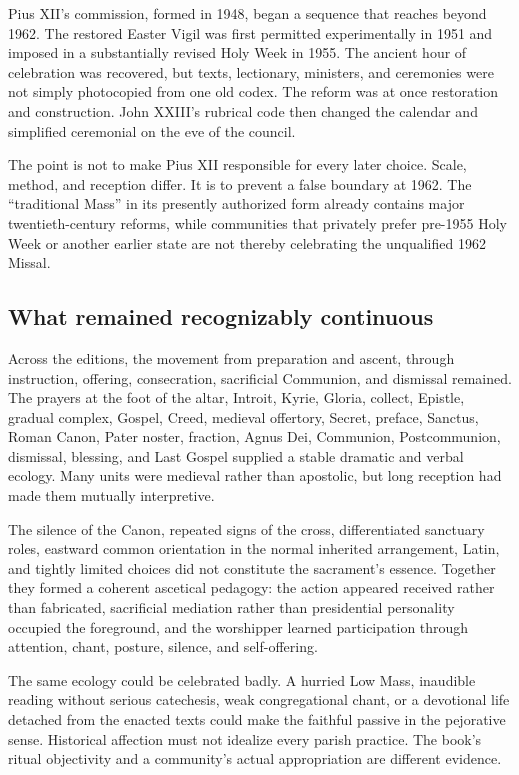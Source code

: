 Pius XII's commission, formed in 1948, began a sequence that reaches beyond 1962. The restored Easter Vigil was first permitted experimentally in 1951 and imposed in a substantially revised Holy Week in 1955. The ancient hour of celebration was recovered, but texts, lectionary, ministers, and ceremonies were not simply photocopied from one old codex. The reform was at once restoration and construction. John XXIII's rubrical code then changed the calendar and simplified ceremonial on the eve of the council.

The point is not to make Pius XII responsible for every later choice. Scale, method, and reception differ. It is to prevent a false boundary at 1962. The “traditional Mass” in its presently authorized form already contains major twentieth-century reforms, while communities that privately prefer pre-1955 Holy Week or another earlier state are not thereby celebrating the unqualified 1962 Missal.

\subsection{What remained recognizably continuous}

Across the editions, the movement from preparation and ascent, through instruction, offering, consecration, sacrificial Communion, and dismissal remained. The prayers at the foot of the altar, Introit, Kyrie, Gloria, collect, Epistle, gradual complex, Gospel, Creed, medieval offertory, Secret, preface, Sanctus, Roman Canon, Pater noster, fraction, Agnus Dei, Communion, Postcommunion, dismissal, blessing, and Last Gospel supplied a stable dramatic and verbal ecology. Many units were medieval rather than apostolic, but long reception had made them mutually interpretive.

The silence of the Canon, repeated signs of the cross, differentiated sanctuary roles, eastward common orientation in the normal inherited arrangement, Latin, and tightly limited choices did not constitute the sacrament's essence. Together they formed a coherent ascetical pedagogy: the action appeared received rather than fabricated, sacrificial mediation rather than presidential personality occupied the foreground, and the worshipper learned participation through attention, chant, posture, silence, and self-offering.

The same ecology could be celebrated badly. A hurried Low Mass, inaudible reading without serious catechesis, weak congregational chant, or a devotional life detached from the enacted texts could make the faithful passive in the pejorative sense. Historical affection must not idealize every parish practice. The book's ritual objectivity and a community's actual appropriation are different evidence.


